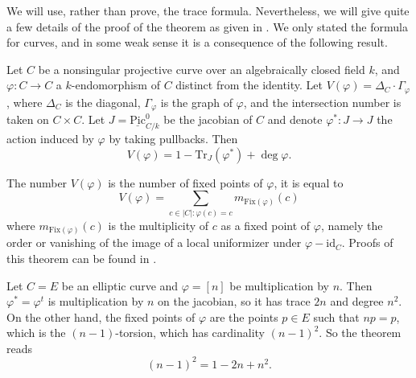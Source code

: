 \noindent
We will use, rather than prove, the trace formula. Nevertheless, we will
give quite a few details of the proof of the theorem as given in
\cite{SGA4.5}. We only stated the formula for curves, and in some weak
sense it is a consequence of the following result.

\begin{theorem}[Weil]
\label{thm:WeilTraceFormula}
Let $C$ be a nonsingular projective curve over an algebraically closed field
$k$, and $\varphi : C \to C$ a $k$-endomorphism of $C$ distinct from the
identity. Let $V(\varphi) = \Delta_C \cdot \Gamma_\varphi$, where $\Delta_C$ is
the diagonal, $\Gamma_\varphi$ is the graph of $\varphi$, and the intersection
number is taken on $C\times C$. Let $J = \underline{\text{Pic}}^0_{C/k}$ be the
jacobian of $C$ and denote $\varphi^* : J \to J$ the action induced by
$\varphi$ by taking pullbacks. Then
$$
V(\varphi) = 1 - \text{Tr}_J(\varphi^*) + \deg \varphi.
$$
\end{theorem}

The number $V(\varphi)$ is the number of fixed points of $\varphi$, it is equal
to
$$
V(\varphi) = \sum_{c \in |C| : \varphi(c) = c} m_\text{Fix$(\varphi)$} (c)
$$
where $m_\text{Fix$(\varphi)$} (c)$ is the multiplicity of $c$ as a fixed point
of $\varphi$, namely the order or vanishing of the image of a local uniformizer
under $\varphi - \text{id}_C$. Proofs of this theorem can be found in
\cite{Lang, Weil}.

\begin{example}
Let $C = E$ be an elliptic curve and $\varphi = [n]$ be multiplication by $n$.
Then $\varphi^* = \varphi^t$ is multiplication by $n$ on the jacobian, so it
has trace $2n$ and degree $n^2$. On the other hand, the fixed points of
$\varphi$ are the points $p \in E$ such that $n p = p$, which is the
$(n-1)$-torsion, which has cardinality $(n-1)^2$. So the theorem reads
$$
(n-1)^2 = 1 - 2n + n^2.
$$
\end{example}

